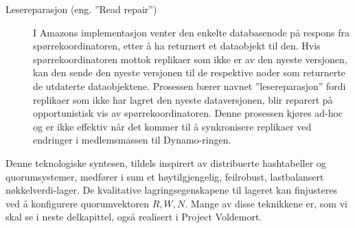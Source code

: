 \begin{description}
  \item [Lesereparasjon (eng. ''Read repair'')] I Amazons implementasjon venter den enkelte databasenode på respons fra spørrekoordinatoren, etter å ha returnert et dataobjekt til den. Hvis spørrekoordinatoren mottok replikaer som ikke er av den nyeste versjonen, kan den sende den nyeste versjonen til de respektive noder som returnerte de utdaterte dataobjektene. Prosessen bærer navnet ''lesereparasjon'' fordi replikaer som ikke har lagret den nyeste dataversjonen, blir reparert på opportunistisk vis av spørrekoordinatoren. Denne prosessen kjøres ad-hoc og er ikke effektiv når det kommer til å synkronisere replikaer ved endringer i medlemsmassen til Dynamo-ringen.
\end{description}

Denne teknologiske syntesen, tildels inspirert av distribuerte hashtabeller og quorumsystemer, medfører i sum et høytilgjengelig, feilrobust, lastbalansert nøkkelverdi-lager. De kvalitative lagringsegenskapene til lageret kan finjusteres ved å konfigurere quorumvektoren \(R, W, N\). Mange av disse teknikkene er, som vi skal se i neste delkapittel, også realisert i Project Voldemort.

